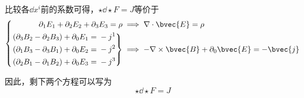 比较各$\dd x^i$前的系数可得，$\star \dd \star F = J$等价于
\begin{equation}
\left\{
\begin{aligned}
\partial_1E_1+\partial_2E_2+\partial_3E_3 = \rho&\implies \nabla\cdot \bvec{E}=\rho\\
\left.
\begin{aligned}
(\partial_3B_2-\partial_2B_3)+\partial_0E_1 ={}& -j^1\\
(\partial_1B_3-\partial_3B_1)+\partial_0E_2 ={}& -j^2\\
(\partial_2B_1-\partial_1B_2)+\partial_0E_3 ={}& -j^3
\end{aligned}
\right\}&
\implies -\nabla\times \bvec{B}+\partial_0\bvec{E}=-\bvec{j}
\end{aligned}
\right. 
\end{equation}



因此，剩下两个方程可以写为
\begin{equation}
    \star \dd \star F = J
\end{equation}





























